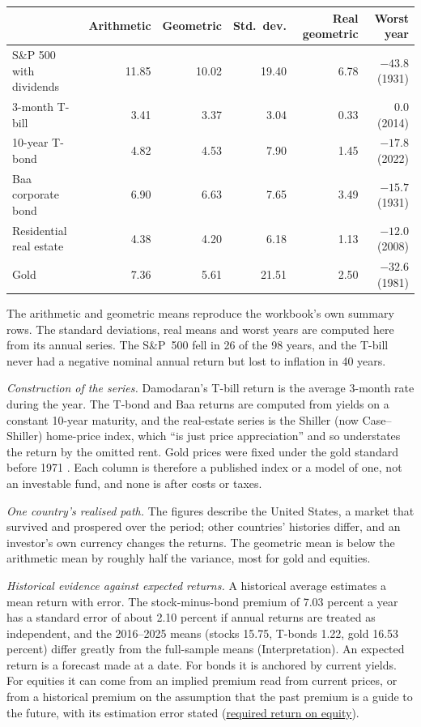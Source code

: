 \begin{qfdefinition}
\begin{center}\small
\begin{tabular}{@{}lrrrrr@{}}
\toprule
 & Arithmetic & Geometric & Std.\ dev. & Real geometric & Worst year \\
\midrule
S\&P 500 with dividends & 11.85 & 10.02 & 19.40 & 6.78 & $-43.8$ (1931) \\
3-month T-bill & 3.41 & 3.37 & 3.04 & 0.33 & 0.0 (2014) \\
10-year T-bond & 4.82 & 4.53 & 7.90 & 1.45 & $-17.8$ (2022) \\
Baa corporate bond & 6.90 & 6.63 & 7.65 & 3.49 & $-15.7$ (1931) \\
Residential real estate & 4.38 & 4.20 & 6.18 & 1.13 & $-12.0$ (2008) \\
Gold & 7.36 & 5.61 & 21.51 & 2.50 & $-32.6$ (1981) \\
\bottomrule
\end{tabular}
\end{center}

The arithmetic and geometric means reproduce the workbook's own summary rows. The standard deviations, real means and worst years are computed here from its annual series. The S\&P~500 fell in 26 of the 98 years, and the T-bill never had a negative nominal annual return but lost to inflation in 40 years.

 \emph{Construction of the series.} Damodaran's T-bill return is the average 3-month rate during the year. The T-bond and Baa returns are computed from yields on a constant 10-year maturity, and the real-estate series is the Shiller (now Case--Shiller) home-price index, which ``is just price appreciation'' and so understates the return by the omitted rent. Gold prices were fixed under the gold standard before 1971 \citep[sheet ``Explanations and FAQ'' and note to ``Returns by year'']{us-asset-returns-1928-2025}. Each column is therefore a published index or a model of one, not an investable fund, and none is after costs or taxes.

\emph{One country's realised path.} The figures describe the United States, a market that survived and prospered over the period; other countries' histories differ, and an investor's own currency changes the returns. The geometric mean is below the arithmetic mean by roughly half the variance, most for gold and equities.

\emph{Historical evidence against expected returns.} A historical average estimates a mean return with error. The stock-minus-bond premium of 7.03 percent a year has a standard error of about 2.10 percent if annual returns are treated as independent, and the 2016--2025 means (stocks 15.75, T-bonds 1.22, gold 16.53 percent) differ greatly from the full-sample means (Interpretation). An expected return is a forecast made at a date. For bonds it is anchored by current yields. For equities it can come from an implied premium read from current prices, or from a historical premium on the assumption that the past premium is a guide to the future, with its estimation error stated (\hyperref[meth:required-return-on-equity]{required return on equity}).


\end{qfdefinition}
